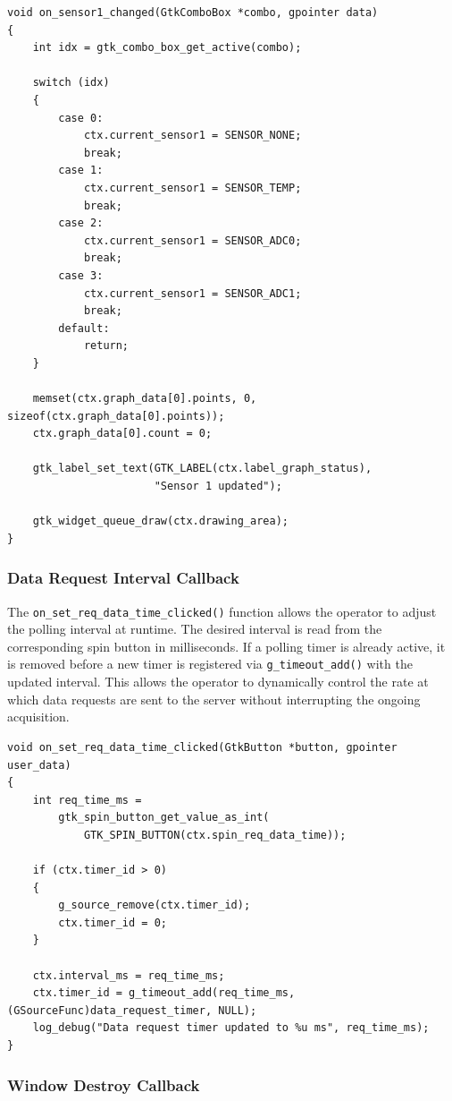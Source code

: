 \begin{verbatim}
void on_sensor1_changed(GtkComboBox *combo, gpointer data)
{
    int idx = gtk_combo_box_get_active(combo);

    switch (idx)
    {
		case 0:
			ctx.current_sensor1 = SENSOR_NONE;
			break;
		case 1:
			ctx.current_sensor1 = SENSOR_TEMP;
			break;
		case 2:
			ctx.current_sensor1 = SENSOR_ADC0;
			break;
		case 3:
			ctx.current_sensor1 = SENSOR_ADC1;
			break;
		default:
			return;
    }

    memset(ctx.graph_data[0].points, 0, sizeof(ctx.graph_data[0].points));
    ctx.graph_data[0].count = 0;

    gtk_label_set_text(GTK_LABEL(ctx.label_graph_status),
                       "Sensor 1 updated");

    gtk_widget_queue_draw(ctx.drawing_area);
}
\end{verbatim}

\subsubsection{Data Request Interval Callback}

The \texttt{on\_set\_req\_data\_time\_clicked()} function allows the
operator to adjust the polling interval at runtime. The desired interval
is read from the corresponding spin button in milliseconds. If a polling
timer is already active, it is removed before a new timer is registered
via \texttt{g\_timeout\_add()} with the updated interval. This allows the
operator to dynamically control the rate at which data requests are sent
to the server without interrupting the ongoing acquisition.

\begin{verbatim}
void on_set_req_data_time_clicked(GtkButton *button, gpointer user_data)
{
    int req_time_ms =
        gtk_spin_button_get_value_as_int(
            GTK_SPIN_BUTTON(ctx.spin_req_data_time));

    if (ctx.timer_id > 0)
    {
        g_source_remove(ctx.timer_id);
        ctx.timer_id = 0;
    }

    ctx.interval_ms = req_time_ms;
    ctx.timer_id = g_timeout_add(req_time_ms, (GSourceFunc)data_request_timer, NULL);
    log_debug("Data request timer updated to %u ms", req_time_ms);
}
\end{verbatim}


\subsubsection{Window Destroy Callback}

